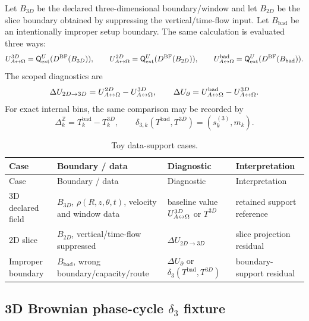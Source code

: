 Let \(B_{3D}\) be the declared three-dimensional boundary/window and let \(B_{2D}\) be the slice boundary obtained by suppressing the vertical/time-flow input. Let \(B_{\mathrm{bad}}\) be an intentionally improper setup boundary. The same calculation is evaluated three ways:
\[
U^{3D}_{A{\leftrightarrow}\Omega}=\mathsf Q^U_{\mathrm{ext}}(D^{\mathrm{BF}}(B_{3D})),
\qquad
U^{2D}_{A{\leftrightarrow}\Omega}=\mathsf Q^U_{\mathrm{ext}}(D^{\mathrm{BF}}(B_{2D})),
\qquad
U^{\mathrm{bad}}_{A{\leftrightarrow}\Omega}=\mathsf Q^U_{\mathrm{ext}}(D^{\mathrm{BF}}(B_{\mathrm{bad}})).
\]
The scoped diagnostics are
\[
\Delta U_{2D\to3D}=U^{2D}_{A{\leftrightarrow}\Omega}-U^{3D}_{A{\leftrightarrow}\Omega},
\qquad
\Delta U_{\partial}=U^{\mathrm{bad}}_{A{\leftrightarrow}\Omega}-U^{3D}_{A{\leftrightarrow}\Omega}.
\]
For exact internal bins, the same comparison may be recorded by
\[
\Delta_k^{\mathbb Z}=T_k^{\mathrm{bad}}-T_k^{3D},
\qquad
\delta_{3,k}(T^{\mathrm{bad}},T^{3D})=(s_k^{(3)},m_k).
\]

\small
\begin{longtable}{@{}p{}p{}p{}p{}@{}}
\caption{Toy data-support cases.}\label{tab:toy-data-support-cases}\\
\toprule
Case & Boundary / data & Diagnostic & Interpretation\\
\midrule
\endfirsthead
\toprule
Case & Boundary / data & Diagnostic & Interpretation\\
\midrule
\endhead
3D declared field & \(B_{3D}\), \(\rho(R,z,\theta,t)\), velocity and window data & baseline value \(U^{3D}_{A{\leftrightarrow}\Omega}\) or \(T^{3D}\) & retained support reference\\
2D slice & \(B_{2D}\), vertical/time-flow suppressed & \(\Delta U_{2D\to3D}\) & slice projection residual\\
Improper boundary & \(B_{\mathrm{bad}}\), wrong boundary/capacity/route & \(\Delta U_{\partial}\) or \(\delta_3(T^{\mathrm{bad}},T^{3D})\) & boundary-support residual\\
\bottomrule
\end{longtable}
\normalsize




\subsection{3D Brownian phase-cycle \texorpdfstring{$\delta_3$}{delta3} fixture}\label{manual:brownian-phase-delta3-fixture}

